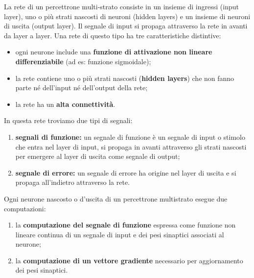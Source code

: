 La rete di un percettrone multi-strato consiste in un insieme di ingressi (input layer), uno o più strati nascosti di neuroni (hidden layers) e un insieme di neuroni di uscita (output layer). Il segnale di input si propaga attraverso la rete in avanti da layer a layer. Una rete di questo tipo ha tre caratteristiche distintive:
\begin{itemize}
	\item ogni neurone include una \textbf{funzione di attivazione non lineare differenziabile }(ad es: funzione
	sigmoidale);
	\item la rete contiene uno o più strati nascosti (\textbf{hidden layers}) che non fanno parte né dell'input né dell'output della rete;
	\item la rete ha un \textbf{alta connettività}.
\end{itemize}
In questa rete troviamo due tipi di segnali:
\begin{enumerate}
	\item \textbf{segnali di funzione:} un segnale di funzione è un segnale di input o stimolo che entra nel layer di input, si propaga in avanti attraverso gli strati nascosti per emergere al layer di uscita come segnale di output;
	\item \textbf{segnale di errore:} un segnale di errore ha origine nel layer di uscita e si propaga all'indietro attraverso la rete.
\end{enumerate}

Ogni neurone nascosto o d'uscita di un percettrone multistrato esegue due computazioni:
\begin{enumerate}
	\item la \textbf{computazione del segnale di funzione} espressa come funzione non lineare continua
	di un segnale di input e dei pesi sinaptici associati al neurone;
	\item la \textbf{computazione di un vettore gradiente} necessario per aggiornamento dei pesi
	sinaptici.
\end{enumerate}


\newpage

